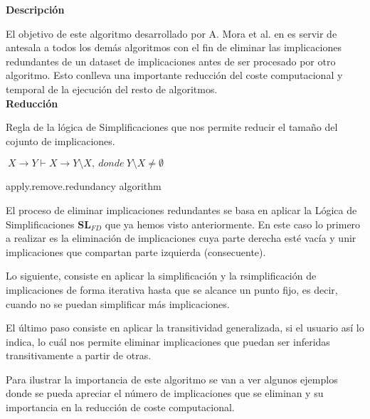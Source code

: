 \textbf{Descripci\'on} 

El objetivo de este algoritmo desarrollado por A. Mora et al. en \cite{Mora2003} es servir de antesala a todos los dem\'as algoritmos con el fin de eliminar las implicaciones redundantes de un dataset de implicaciones antes de ser procesado por otro algoritmo. Esto conlleva una importante reducci\'on del coste computacional y temporal de la ejecuci\'on del resto de algoritmos.\\

\textbf{Reducci\'on}

Regla de la l\'ogica de Simplificaciones que nos permite reducir el tama\~no del cojunto de implicaciones.

\begin{center}
    \(\ X \to Y \vdash X \to Y \setminus X, \ donde \ Y \setminus X \neq \emptyset \)
\end{center} 

\IncMargin{1em}
\begin{algorithm}[H]
    \SetAlgoLined
    \LinesNumbered
    \DontPrintSemicolon
    \caption{apply.remove.redundancy algorithm}\label{alg:1}
\end{algorithm}\DecMargin{1em}
\bigskip
El proceso de eliminar implicaciones redundantes se basa en aplicar la L\'ogica de Simplificaciones \(\textbf{SL}_{FD}\) que ya hemos visto anteriormente. En este caso lo primero a realizar es la eliminaci\'on de implicaciones cuya parte derecha est\'e vac\'ia y unir implicaciones que compartan parte izquierda (consecuente).

Lo siguiente, consiste en aplicar la simplificaci\'on y la rsimplificaci\'on de implicaciones de forma iterativa hasta que se alcance un punto fijo, es decir, cuando no se puedan simplificar m\'as implicaciones.

El \'ultimo paso consiste en aplicar la transitividad generalizada, si el usuario as\'i lo indica, lo cu\'al nos permite eliminar implicaciones que puedan ser inferidas transitivamente a partir de otras.

Para ilustrar la importancia de este algoritmo se van a ver algunos ejemplos donde se pueda apreciar el n\'umero de implicaciones que se eliminan y su importancia en la reducci\'on de coste computacional.

